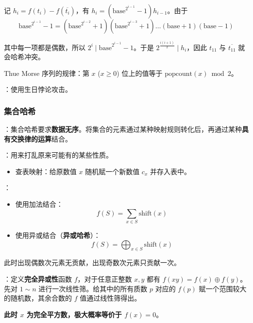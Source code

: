 记 $h_i = f(t_i) - f(\overline{t_i})$，有 $h_i = \left(\mathrm{base}^{2^{i - 1}} - 1\right)h_{i - 1}$。由于
\[
\mathrm{base}^{2^{i - 1}} - 1 = (\mathrm{base}^{2^{i - 2}} + 1)(\mathrm{base}^{2^{i - 3}} + 1)\dots(\mathrm{base} + 1)(\mathrm{base} - 1)
\]

其中每一项都是偶数，所以 $2^i \mid \mathrm{base}^{2^{i - 1}} - 1$。于是 $2^{\frac{i(i + 1)}{2}} \mid h_i$，因此 $t_{11}$ 与 $\overline{t_{11}}$ 就会哈希冲突。

\begin{quoteblock}
Thue Morse 序列的规律：第 $x$ ($x \geq 0$) 位上的值等于 $\mathrm{popcount}(x) \bmod 2$。
\end{quoteblock}

：使用生日悖论攻击。

\subsubsection{集合哈希}

：集合哈希要求\textbf{数据无序}。将集合的元素通过某种映射规则转化后，再通过某种\textbf{具有交换律的运算}结合。

：用来打乱原来可能有的某些性质。

\begin{itemize}
    \item 查表映射：给原数值 $x$ 随机赋一个新数值 $c_x$ 并存入表中。
\end{itemize}

：

\begin{itemize}
    \item 使用加法结合：
    \[
    f(S) = \sum_{x \in S} \mathrm{shift}(x)
    \]

    \item 使用异或结合（\textbf{异或哈希}）：
    \[
    f(S) = \bigoplus_{x \in S} \mathrm{shift}(x)
    \]
\end{itemize}

此时出现偶数次元素无贡献，出现奇数次元素只贡献一次。

：定义\textbf{完全异或性}函数 $f$，对于任意正整数 $x, y$ 都有 $f(xy) = f(x) \oplus f(y)$。先对 $1 \sim n$ 进行一次线性筛。给其中的所有质数 $p$ 对应的 $f(p)$ 赋一个范围较大的随机数，其余合数的 $f$ 值通过线性筛得出。

\textbf{此时 $x$ 为完全平方数，极大概率等价于 $f(x) = 0$}。

